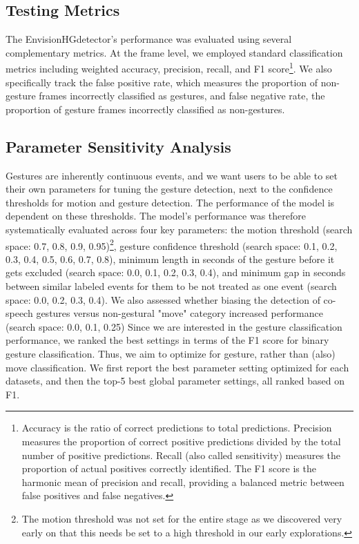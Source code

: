 \documentclass[11pt,headings=small,cleardoublepage=empty,tocflat,numbers=noenddot,twoside,captions=tableheading]{scrbook}
\begin{document}
\begin{refsection}
\subsection{Testing Metrics}
The EnvisionHGdetector's performance was evaluated using several complementary metrics. At the frame level, we employed standard classification metrics including weighted accuracy, precision, recall, and F1 score\footnote{Accuracy is the ratio of correct predictions to total predictions. Precision measures the proportion of correct positive predictions divided by the total number of positive predictions. Recall (also called sensitivity) measures the proportion of actual positives correctly identified. The F1 score is the harmonic mean of precision and recall, providing a balanced metric between false positives and false negatives.}. We also specifically track the false positive rate, which measures the proportion of non-gesture frames incorrectly classified as gestures, and false negative rate, the proportion of gesture frames incorrectly classified as non-gestures.

\subsection{Parameter Sensitivity Analysis}
Gestures are inherently continuous events, and we want users to be able to set their own parameters for tuning the gesture detection, next to the confidence thresholds for motion and gesture detection. The performance of the model is dependent on these thresholds. The model's performance was therefore systematically evaluated across four key parameters: the motion threshold (search space: 0.7, 0.8, 0.9, 0.95)\footnote{The motion threshold was not set for the entire stage as we discovered very early on that this needs be set to a high threshold in our early explorations.}, gesture confidence threshold (search space: 0.1, 0.2, 0.3, 0.4, 0.5, 0.6, 0.7, 0.8), minimum length in seconds of the gesture before it gets excluded (search space: 0.0, 0.1, 0.2, 0.3, 0.4), and minimum gap in seconds between similar labeled events for them to be not treated as one event (search space: 0.0, 0.2, 0.3, 0.4). We also assessed whether biasing the detection of co-speech gestures versus non-gestural "move" category increased performance (search space: 0.0, 0.1, 0.25) Since we are interested in the gesture classification performance, we ranked the best settings in terms of the F1 score for binary gesture classification. Thus, we aim to optimize for gesture, rather than (also) move classification. We first report the best parameter setting optimized for each datasets, and then the top-5 best global parameter settings, all ranked based on F1.


\end{refsection}
\end{document}

